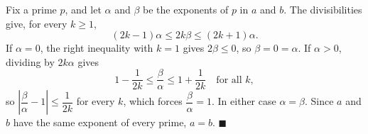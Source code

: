 Fix a prime $p$, and let $\alpha$ and $\beta$ be the exponents of $p$ in $a$ and $b$. The divisibilities give, for every $k\ge1$,
\[
(2k-1)\alpha\le2k\beta\le(2k+1)\alpha .
\]
If $\alpha=0$, the right inequality with $k=1$ gives $2\beta\le0$, so $\beta=0=\alpha$. If $\alpha>0$, dividing by $2k\alpha$ gives
\[
1-\dfrac{1}{2k}\le\dfrac{\beta}{\alpha}\le1+\dfrac{1}{2k}\quad\text{for all }k,
\]
so $\left|\dfrac{\beta}{\alpha}-1\right|\le\dfrac{1}{2k}$ for every $k$, which forces $\dfrac{\beta}{\alpha}=1$. In either case $\alpha=\beta$. Since $a$ and $b$ have the same exponent of every prime, $a=b$. $\blacksquare$
